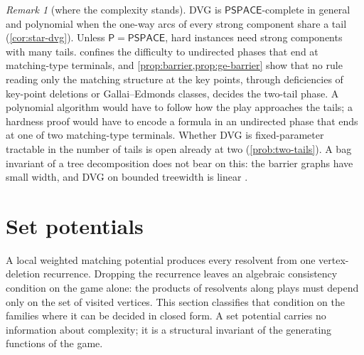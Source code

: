 \documentclass[11pt]{amsart}
\theoremstyle{plain}
\theoremstyle{definition}
\theoremstyle{remark}
\newtheorem{remark}[theorem]{Remark}
\numberwithin{equation}{section}
\newcommand{\cls}[1]{\mathsf{#1}}
\newcommand{\PSPACE}{\cls{PSPACE}}
\newcommand{\Pclass}{\cls{P}}
\begin{document}
\begin{remark}[where the complexity stands]\label{rem:tails-complexity}
DVG is $\PSPACE$-complete in general \cite{LichtensteinSipser} and polynomial when the one-way arcs of every strong component share a tail (\cref{cor:star-dvg}). Unless $\Pclass=\PSPACE$, hard instances need strong components with many tails.  confines the difficulty to undirected phases that end at matching-type terminals, and \cref{prop:barrier,prop:ge-barrier} show that no rule reading only the matching structure at the key points, through deficiencies of key-point deletions or Gallai--Edmonds classes, decides the two-tail phase. A polynomial algorithm would have to follow how the play approaches the tails; a hardness proof would have to encode a formula in an undirected phase that ends at one of two matching-type terminals. Whether DVG is fixed-parameter tractable in the number of tails is open already at two (\cref{prob:two-tails}). A bag invariant of a tree decomposition does not bear on this: the barrier graphs have small width, and DVG on bounded treewidth is linear \cite{Bodlaender}.
\end{remark}

\section{Set potentials}\label{sec:setpot}

A local weighted matching potential produces every resolvent from one vertex-deletion recurrence. Dropping the recurrence leaves an algebraic consistency condition on the game alone: the products of resolvents along plays must depend only on the set of visited vertices. This section classifies that condition on the families where it can be decided in closed form. A set potential carries no information about complexity; it is a structural invariant of the generating functions of the game.
\end{document}
